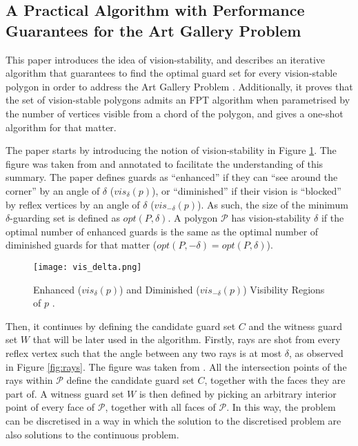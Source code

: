 \subsection{A Practical Algorithm with Performance Guarantees for the Art Gallery Problem \cite{DBLP:journals/corr/abs-2007-06920}}
This paper \cite{DBLP:journals/corr/abs-2007-06920} introduces the idea of vision-stability, and describes an iterative algorithm that guarantees to find the optimal guard set for every vision-stable polygon in order to address the Art Gallery Problem \cite{o1987art}. Additionally, it proves that the set of vision-stable polygons admits an FPT algorithm when parametrised by the number of vertices visible from a chord of the polygon, and gives a one-shot algorithm for that matter.

The paper \cite{DBLP:journals/corr/abs-2007-06920} starts by introducing the notion of vision-stability in Figure \ref{fig:vis}. The figure was taken from \cite{DBLP:journals/corr/abs-2007-06920} and annotated to facilitate the understanding of this summary. The paper defines guards as ``enhanced'' if they can ``see around the corner'' by an angle of $\delta$ ($vis_\delta(p)$), or ``diminished'' if their vision is ``blocked'' by reflex vertices by an angle of $\delta$ ($vis_{-\delta}(p)$). As such, the size of the minimum $\delta$-guarding set is defined as $opt(P, \delta)$. A polygon $\mathcal P$ has vision-stability $\delta$ if the optimal number of enhanced guards is the same as the optimal number of diminished guards for that matter ($opt(P, -\delta) = opt(P, \delta)$). 

\begin{figure}[h!]
    \centering
    \texttt{[image: vis\_delta.png]}
    \caption{Enhanced ($vis_\delta(p)$) and Diminished ($vis_{-\delta}(p)$) Visibility Regions of $p$ \cite{DBLP:journals/corr/abs-2007-06920}.}
    \label{fig:vis}
\end{figure}

Then, it continues by defining the candidate guard set $C$ and the witness guard set $W$ that will be later used in the algorithm. Firstly, rays are shot from every reflex vertex such that the angle between any two rays is at most $\delta$, as observed in Figure \ref{fig:rays}. The figure was taken from \cite{DBLP:journals/corr/abs-2007-06920}. All the intersection points of the rays within $\mathcal P$ define the candidate guard set $C$, together with the faces they are part of. A witness guard set $W$ is then defined by picking an arbitrary interior point of every face of $\mathcal P$, together with all faces of $\mathcal P$. In this way, the problem can be discretised in a way in which the solution to the discretised problem are also solutions to the continuous problem.

